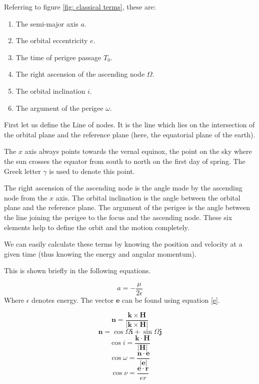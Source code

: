 \documentclass{article}
\theoremstyle{definition}
\begin{document}
Referring to figure \ref{fig: classical terms}, these are:
\begin{enumerate}
    \item The semi-major axis $a$.
    \item The orbital eccentricity $e$.
    \item The time of perigee passage $T_0$.
    \item The right ascension of the ascending node $\Omega$.
    \item The orbital inclination $i$.
    \item The argument of the perigee $\omega$.
\end{enumerate}

First let us define the Line of nodes. It is the line which lies on the intersection of the orbital plane and the reference plane (here, the equatorial plane of the earth).

The $x$ axis always points towards the vernal equinox, the point on the sky where the sun crosses the equator from south to north on the first day of spring. The Greek letter $\gamma$ is used to denote this point.

The right ascension of the ascending node is the angle made by the ascending node from the $x$ axis.
The orbital inclination is the angle between the orbital plane and the reference plane.
The argument of the perigee is the angle between the  line joining the perigee to the  focus and the ascending node.
These six elements help to define the orbit and the motion completely. \medskip

We can easily calculate these terms by knowing the position and velocity at a given time (thus knowing the energy and angular momentum). 

This is shown briefly in the following equations.

\begin{equation}
    a = - \frac{\mu}{2\epsilon}
\end{equation}
Where $\epsilon$ denotes energy. The vector $\boldsymbol{e}$ can be found using equation \ref{e}.

\begin{equation}
    \boldsymbol{n}= \frac{\boldsymbol{k}\times \boldsymbol{H}}{|\boldsymbol{k}\times \boldsymbol{H}|}
\end{equation}
\begin{equation}
    \boldsymbol{n}= \cos{\Omega}\boldsymbol{i} + \sin{\Omega}\boldsymbol{j}
\end{equation}
\begin{equation}
    \cos{i} = \frac{\boldsymbol{k\cdot H}}{|\boldsymbol{H}|}
\end{equation}
\begin{equation}
    \cos{\omega} = \frac{\boldsymbol{n\cdot e}}{|\boldsymbol{e}|}
\end{equation}
\begin{equation}
    \cos{\nu} = \frac{\boldsymbol{e\cdot r}}{er}
\end{equation}
\end{document}
